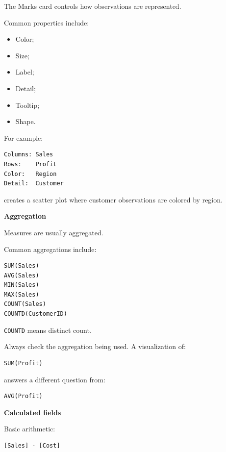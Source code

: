 \documentclass[11pt,letterpaper]{article}
\begin{document}
The Marks card controls how observations are represented.

Common properties include:

\begin{itemize}[leftmargin=*]
    \item Color;
    \item Size;
    \item Label;
    \item Detail;
    \item Tooltip;
    \item Shape.
\end{itemize}

For example:

\begin{lstlisting}
Columns: Sales
Rows:    Profit
Color:   Region
Detail:  Customer
\end{lstlisting}

creates a scatter plot where customer observations are colored by region.



\textbf{Aggregation}

Measures are usually aggregated.

Common aggregations include:

\begin{lstlisting}
SUM(Sales)
AVG(Sales)
MIN(Sales)
MAX(Sales)
COUNT(Sales)
COUNTD(CustomerID)
\end{lstlisting}

\texttt{COUNTD} means distinct count.

Always check the aggregation being used. A visualization of:

\begin{lstlisting}
SUM(Profit)
\end{lstlisting}

answers a different question from:

\begin{lstlisting}
AVG(Profit)
\end{lstlisting}



\textbf{Calculated fields}

Basic arithmetic:

\begin{lstlisting}
[Sales] - [Cost]
\end{lstlisting}
\end{document}
